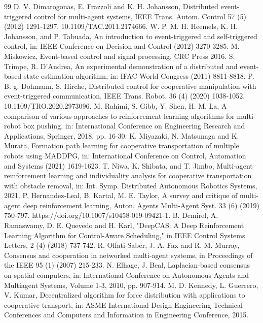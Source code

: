 \documentclass[letterpaper, 10 pt, conference]{ieeeconf} %
\begin{document}
\begin{thebibliography}{99}
 D. V. Dimarogonas, E. Frazzoli and K. H. Johansson, Distributed event-triggered control for multi-agent systems, IEEE Trans. Autom. Control 57 (5) (2012) 1291-1297. 10.1109/TAC.2011.2174666.
 W. P. M. H. Heemels, K. H. Johansson, and P. Tabuada, An introduction to event-triggered and self-triggered control, in: IEEE Conference on Decision and Control (2012) 3270-3285.
 M. Miskowicz, Event-based control and signal processing, CRC Press 2016.
 S. Trimpe, R. D'Andrea, An experimental demonstration of a distributed and event-based state estimation algorithm, in: IFAC World Congress (2011) 8811-8818.
 P. B. g. Dohmann, S. Hirche, Distributed control for cooperative manipulation with event-triggered communication, IEEE Trans. Robot. 36 (4) (2020) 1038-1052. 10.1109/TRO.2020.2973096.
 M. Rahimi, S. Gibb, Y. Shen, H. M. La, A comparison of various approaches to reinforcement learning algorithms for multi-robot box pushing, in: International Conference on Engineering Research and Applications, Springer, 2018, pp. 16-30.
 K. Miyazaki, N. Matsunaga and K. Murata, Formation path learning for cooperative transportation of multiple robots using MADDPG, in: International Conference on Control, Automation and Systems (2021) 1619-1623.
 T. Niwa, K. Shibata, and T. Jimbo, Multi-agent reinforcement learning and individuality analysis for cooperative transportation with obstacle removal, in: Int. Symp. Distributed Autonomous Robotics Systems, 2021.
 P. Hernandez-Leal, B. Kartal, M. E. Taylor, A survey and critique of multi-agent deep reinforcement learning, Auton. Agents Multi-Agent Syst. 33 (6) (2019) 750-797. https://doi.org/10.1007/s10458-019-09421-1.
 B. Demirel, A. Ramaswamy, D. E. Quevedo and H. Karl, "DeepCAS: A Deep Reinforcement Learning Algorithm for Control-Aware Scheduling," in IEEE Control Systems Letters, 2 (4) (2018) 737-742.
 R. Olfati-Saber, J. A. Fax and R. M. Murray, Consensus and cooperation in networked multi-agent systems, in Proceedings of the IEEE 95 (1) (2007) 215-233.
 N. Elhage, J. Beal, Laplacian-based consensus on spatial computers, in: International Conference on Autonomous Agents and Multiagent Systems, Volume 1-3, 2010, pp. 907-914.
 M. D. Kennedy, L. Guerrero, V. Kumar, Decentralized algorithm for force distribution with applications to cooperative transport, in: ASME International Design Engineering Technical Conferences and Computers and Information in Engineering Conference, 2015.

\end{thebibliography}
\end{document}
